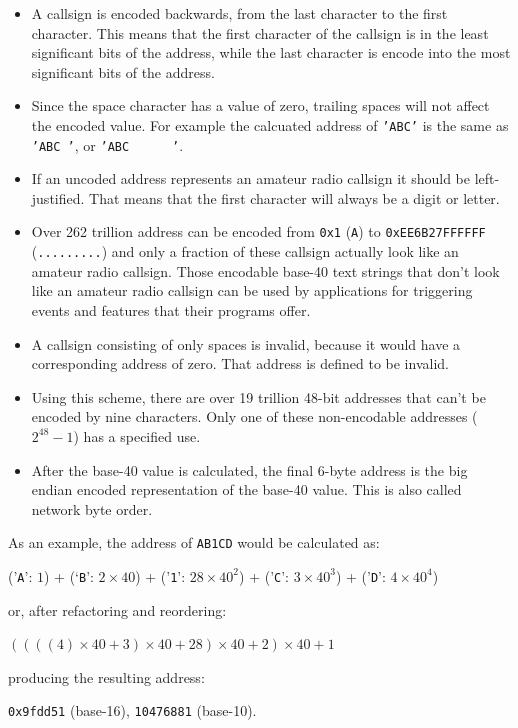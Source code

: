 \documentclass[a4paper,11pt,oneside]{book}
\begin{document}
\begin{itemize}
	\item
		A callsign is encoded backwards, from the last character to the first character. This means that the first character of the callsign is in the least significant bits of the address, while the last character is encode into the most significant bits of the address.
	\item
		Since the space character has a value of zero, trailing spaces will not affect the encoded value. For example the calcuated address of \texttt{'ABC'} is the same as \texttt{'ABC~'}, or \texttt{'ABC~~~~~~'}.
	\item
		If an uncoded address represents an amateur radio callsign it should be left-justified. That means that the first character will always be a digit or letter.
	\item
		Over 262 trillion address can be encoded from \texttt{0x1} (\texttt{A}) to \texttt{0xEE6B27FFFFFF} (\texttt{.........}) and only a fraction of these callsign actually look like an amateur radio callsign. Those encodable base-40 text strings that don't look like an amateur radio callsign can be used by applications for triggering events and features that their programs offer.
	\item
		A callsign consisting of only spaces is invalid, because it would have a corresponding address of zero. That address is defined to be invalid.
	\item
		Using this scheme, there are over 19 trillion 48-bit addresses that can't be encoded by nine characters. Only one of these non-encodable addresses ($2^{48}-1$) has a specified use.
	\item
		After the base-40 value is calculated, the final 6-byte address is the big endian encoded representation of the base-40 value. This is also called network byte order.
\end{itemize}

As an example, the address of \texttt{AB1CD} would be calculated as:

('\texttt{A}': $1$) + (`\texttt{B}': $2 \times 40$) + ('\texttt{1}': $28 \times 40^2$) + ('\texttt{C}': $3 \times 40^3$) + ('\texttt{D}': $4 \times 40^4$)

or, after refactoring and reordering:

$( ( ( ( 4 ) \times 40 + 3 ) \times 40 + 28 ) \times 40 + 2 ) \times 40 + 1$

producing the resulting address:

\texttt{0x9fdd51} (base-16), \texttt{10476881} (base-10).
\end{document}
